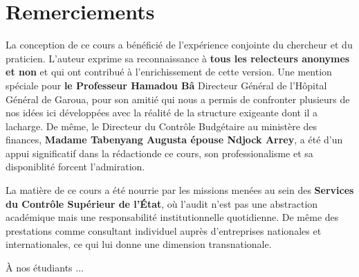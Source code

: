\documentclass[12pt, a4paper, twoside, openany]{book}
\begin{document}
\clearpage
\thispagestyle{empty}
\chapter*{Remerciements}

La conception de ce cours a bénéficié de l'expérience conjointe du chercheur et du praticien. L'auteur exprime sa reconnaissance à \textbf{tous les relecteurs anonymes et non} et qui ont contribué à l'enrichissement de cette version. 
Une mention spéciale pour \textbf{le Professeur Hamadou Bâ} Directeur Général de l'Hôpital Général de Garoua, pour son amitié qui nous a permis de confronter  plusieurs de nos idées ici développées avec la réalité de la structure exigeante dont il a lacharge. De même, le Directeur du Contrôle Budgétaire au ministère des finances, \textbf{Madame Tabenyang Augusta épouse Ndjock Arrey}, a été d'un appui significatif dans la rédactionde ce cours, son professionalisme et sa disponiblité forcent l'admiration.

La matière de ce cours a été nourrie par les missions menées au sein des \textbf{Services du Contrôle Supérieur de l'État}, où l'audit n'est pas une abstraction académique mais une responsabilité institutionnelle quotidienne. De même des prestations comme consultant individuel auprès d'entreprises nationales et internationales, ce qui lui donne une dimension transnationale.

À nos étudiants ...

\tableofcontents
{}
\listoffigures
{}

\listoftables
{}

\lstlistoflistings
{}
\end{document}
